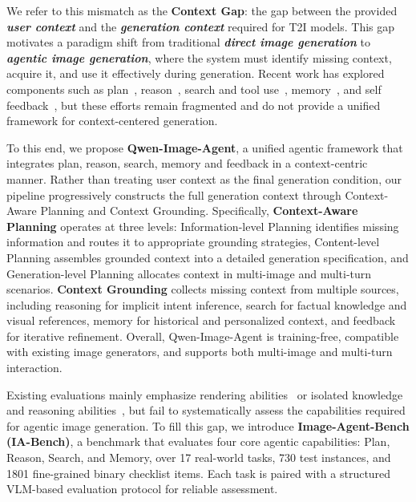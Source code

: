 \documentclass{llmxive}
\begin{document}
We refer to this mismatch as the \textbf{Context Gap}: the gap between the provided \textbf{\textit{user context}} and the \textbf{\textit{generation context}} required for T2I models. This gap motivates a paradigm shift from traditional \textbf{\textit{direct image generation}} to \textbf{\textit{agentic image generation}}, where the system must identify missing context, acquire it, and use it effectively during generation. Recent work has explored components such as plan~\citep{Yao2026PhotoAgentAP}, reason~\citep{He2026MindBrushIA}, search and tool use~\citep{Ye2026AgentBH,Feng2026GenSearcherRA,He2026MindBrushIA}, memory~\citep{He2026GEMSAM}, and self feedback~\citep{Jiang2026GenAgentST,Wang2025ImAgentAU}, but these efforts remain fragmented and do not provide a unified framework for context-centered generation.

To this end, we propose \textbf{Qwen-Image-Agent}, a unified agentic framework that integrates plan, reason, search, memory and feedback in a context-centric manner. Rather than treating user context as the final generation condition, our pipeline progressively constructs the full generation context through Context-Aware Planning and Context Grounding. Specifically, \textbf{Context-Aware Planning} operates at three levels: Information-level Planning identifies missing information and routes it to appropriate grounding strategies, Content-level Planning assembles grounded context into a detailed generation specification, and Generation-level Planning allocates context in multi-image and multi-turn scenarios. \textbf{Context Grounding} collects missing context from multiple sources, including reasoning for implicit intent inference, search for factual knowledge and visual references, memory for historical and personalized context, and feedback for iterative refinement. Overall, Qwen-Image-Agent is training-free, compatible with existing image generators, and supports both multi-image and multi-turn interaction.

Existing evaluations mainly emphasize rendering abilities~\citep{Ghosh2023GenEvalAO, Hu2024ELLAED} or isolated knowledge and reasoning abilities~\citep{Niu2025WISEAW, Zhao2025EnvisioningBT}, but fail to systematically assess the capabilities required for agentic image generation. To fill this gap, we introduce \textbf{Image-Agent-Bench (IA-Bench)}, a benchmark that evaluates four core agentic capabilities: Plan, Reason, Search, and Memory, over 17 real-world tasks, 730 test instances, and 1801 fine-grained binary checklist items. Each task is paired with a structured VLM-based evaluation protocol for reliable assessment.
\end{document}
